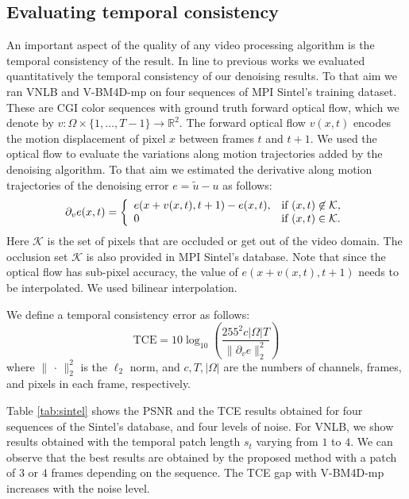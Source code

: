 \documentclass[10pt, journal, twocolumn, final, a4paper]{IEEEtran}
\newcommand{\pcomment}[1]{}
\begin{document}
\subsection{Evaluating temporal consistency}
\label{sse:temporal-consistency}

An important aspect of the quality of any video processing algorithm is the 
temporal consistency of the result. In line to previous works \cite{Liu2010, Sutour2014}
we evaluated quantitatively the temporal consistency of our denoising results.
To that aim we ran VNLB and V-BM4D-mp on four sequences of MPI Sintel's training
dataset. These are CGI color sequences with ground truth forward optical flow, which we
denote by $v:\Omega\times\{1,\dots,T-1\}\rightarrow \mathds R^2$. 
The forward optical flow $v(x,t)$ encodes the motion displacement of pixel $x$
between frames $t$ and $t +1$.
We used the optical flow to evaluate the variations along motion trajectories
added by the denoising algorithm. To that aim we estimated the derivative along
motion trajectories of the denoising error $e = \widetilde u - u$ as follows:
\[\partial_v e(x,t) =
\left\{
\begin{array}{l l}
	e(x + v(x,t), t+1) - e(x,t), & \text{if } (x,t)\not\in \mathcal{K},\\
	0 & \text{if } (x,t)\in \mathcal{K}.
\end{array}
\right.\]
Here $\mathcal K$ is the set of pixels that are occluded or get out of the video
domain. The occlusion set $\mathcal K$ is also provided in MPI Sintel's database.
Note that since the optical flow has sub-pixel accuracy, the value of $e(x + v(x,t),t+1)$
needs to be interpolated. We used bilinear interpolation.

We define a temporal consistency error as follows:
\[\text{TCE} = 10 \log_{10}\left(\frac{255^2 c|\Omega|T}{\|\partial_v e\|_2^2}\right)\]
where $\|\,\cdot\,\|_2^2$ is the $\ell_2$ norm, and $c, T, |\Omega|$ are the numbers
of channels, frames, and pixels in each frame, respectively.

Table \ref{tab:sintel} shows the PSNR and the TCE results obtained for four sequences of the
Sintel's database, and four levels of noise. For VNLB, we show results obtained with 
the temporal patch length $s_t$ varying from $1$ to $4$. We can observe that the best results
are obtained by the proposed method with a patch of $3$ or $4$ frames depending
on the sequence. The TCE gap with V-BM4D-mp increases with the noise level. 
\pcomment{TODO: Comment on these results, but after the results have been
recomputed with the right parameters!}
\end{document}
